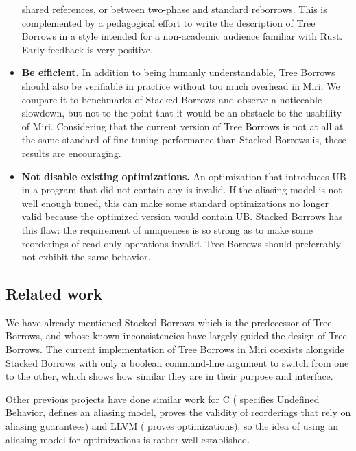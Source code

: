 \documentclass[a4paper,11pt]{article}
\theoremstyle{plain}
\theoremstyle{definition}
\theoremstyle{remark}
\begin{document}
\begin{itemize}
        shared references, or between two-phase and standard reborrows.
        This is complemented by a pedagogical effort to write the
        description of Tree Borrows \cite{perso_treebor}
        in a style intended for a non-academic audience familiar with Rust.
        Early feedback is very positive.
    \item \textbf{Be efficient.} In addition to being humanly understandable, Tree Borrows
        should also be verifiable in practice without too much overhead in Miri.
        We compare it to benchmarks of Stacked Borrows and observe a noticeable slowdown,
        but not to the point that it would be an obstacle to the usability of Miri.
        Considering that the current version of Tree Borrows is not at all at the
        same standard of fine tuning performance than Stacked Borrows is, these
        results are encouraging.
    \item \textbf{Not disable existing optimizations.} An optimization that introduces
        UB in a program that did not contain any is invalid. If the aliasing model
        is not well enough tuned, this can make some standard optimizations no
        longer valid because the optimized version would contain UB.
        Stacked Borrows has this flaw: the requirement of uniqueness
        is so strong as to make some reorderings of read-only operations invalid.
        Tree Borrows should preferrably not exhibit the same behavior.
\end{itemize}

\subsection{Related work}

We have already mentioned Stacked Borrows \cite{stacked_borrows} which is the
predecessor of Tree Borrows, and whose known inconsistencies have largely guided
the design of Tree Borrows. The current implementation of Tree Borrows in
Miri \cite{miri} coexists alongside Stacked Borrows with only a boolean
command-line argument to switch from one to the other, which shows how similar
they are in their purpose and interface.

Other previous projects have done similar work for C
(\cite{c_undef} specifies Undefined Behavior, \cite{c_aliasing_model} defines
an aliasing model, \cite{c_reorderings} proves the validity of reorderings that
rely on aliasing guarantees) and LLVM (\cite{llvm_opts} proves optimizations),
so the idea of using an aliasing model for optimizations is rather well-established.
\end{document}
